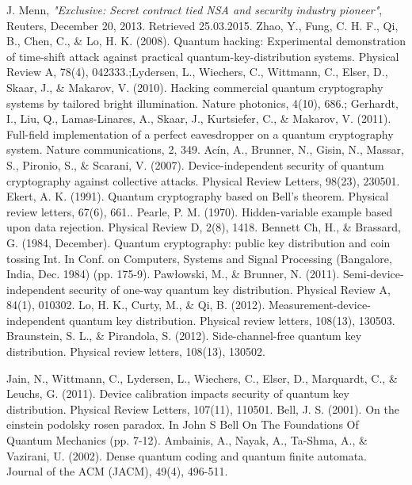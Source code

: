 \documentclass[smallextended]{svjour3}
\begin{document}
\begin{thebibliography}{99}
 J. Menn, {\it "Exclusive: Secret contract tied NSA and security industry pioneer"}, Reuters, December 20, 2013. Retrieved 25.03.2015.
 Zhao, Y., Fung, C. H. F., Qi, B., Chen, C., \& Lo, H. K. (2008). Quantum hacking: Experimental demonstration of time-shift attack against practical quantum-key-distribution systems. Physical Review A, 78(4), 042333.;Lydersen, L., Wiechers, C., Wittmann, C., Elser, D., Skaar, J., \& Makarov, V. (2010). Hacking commercial quantum cryptography systems by tailored bright illumination. Nature photonics, 4(10), 686.; Gerhardt, I., Liu, Q., Lamas-Linares, A., Skaar, J., Kurtsiefer, C., \& Makarov, V. (2011). Full-field implementation of a perfect eavesdropper on a quantum cryptography system. Nature communications, 2, 349.
 Acín, A., Brunner, N., Gisin, N., Massar, S., Pironio, S., \& Scarani, V. (2007). Device-independent security of quantum cryptography against collective attacks. Physical Review Letters, 98(23), 230501.
 Ekert, A. K. (1991). Quantum cryptography based on Bell’s theorem. Physical review letters, 67(6), 661..
 Pearle, P. M. (1970). Hidden-variable example based upon data rejection. Physical Review D, 2(8), 1418.
 Bennett Ch, H., \& Brassard, G. (1984, December). Quantum cryptography: public key distribution and coin tossing Int. In Conf. on Computers, Systems and Signal Processing (Bangalore, India, Dec. 1984) (pp. 175-9).
  Paw{\l}owski, M., \& Brunner, N. (2011). Semi-device-independent security of one-way quantum key distribution. Physical Review A, 84(1), 010302.
 Lo, H. K., Curty, M., \& Qi, B. (2012). Measurement-device-independent quantum key distribution. Physical review letters, 108(13), 130503.
Braunstein, S. L., \& Pirandola, S. (2012). Side-channel-free quantum key distribution. Physical review letters, 108(13), 130502.

 Jain, N., Wittmann, C., Lydersen, L., Wiechers, C., Elser, D., Marquardt, C., \& Leuchs, G. (2011). Device calibration impacts security of quantum key distribution. Physical Review Letters, 107(11), 110501.
 Bell, J. S. (2001). On the einstein podolsky rosen paradox. In John S Bell On The Foundations Of Quantum Mechanics (pp. 7-12).
 Ambainis, A., Nayak, A., Ta-Shma, A., \& Vazirani, U. (2002). Dense quantum coding and quantum finite automata. Journal of the ACM (JACM), 49(4), 496-511.


\end{thebibliography}
\end{document}
